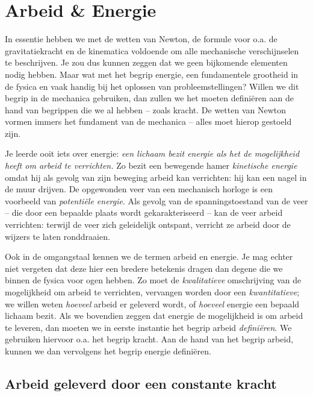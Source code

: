 
\chapter{Arbeid \& Energie}

In essentie hebben we met de wetten van Newton, de formule voor o.a. de gravitatiekracht en de kinematica voldoende om alle mechanische verschijnselen te beschrijven. Je zou dus kunnen zeggen dat we geen bijkomende elementen nodig hebben. Maar wat met het begrip energie, een fundamentele grootheid in de fysica en vaak handig bij het oplossen van probleemstellingen?  Willen we dit begrip in de mechanica gebruiken, dan zullen we het moeten defini\"eren aan de hand van begrippen die we al hebben -- zoals kracht. De wetten van Newton vormen immers het fundament van de mechanica -- alles moet hierop gestoeld zijn. 

Je leerde ooit iets over energie: \textit{een lichaam bezit energie als het de mogelijkheid heeft om arbeid te verrichten.} Zo bezit een bewegende hamer \textit{kinetische energie} omdat hij als gevolg van zijn beweging arbeid kan verrichten: hij kan een nagel in de muur drijven. De opgewonden veer
van een mechanisch horloge is een voorbeeld van \textit{potenti\"ele energie}. Als gevolg van de spanningstoestand van de veer -- die door een bepaalde plaats wordt gekarakteriseerd -- kan de veer arbeid verrichten: terwijl de veer zich geleidelijk ontspant, verricht ze arbeid door de wijzers te laten ronddraaien. %

Ook in de omgangstaal kennen we de termen arbeid en energie. Je mag echter niet vergeten dat deze hier een bredere betekenis dragen dan degene die we binnen de fysica voor ogen hebben. Zo moet de \textit{kwalitatieve} omschrijving van de mogelijkheid om arbeid te verrichten, vervangen worden door een \textit{kwantitatieve}; we willen weten \textit{hoeveel} arbeid er geleverd wordt, of \textit{hoeveel} energie een bepaald lichaam bezit. Als we bovendien zeggen dat energie de mogelijkheid is om arbeid te leveren, dan moeten we in eerste instantie het begrip arbeid \textit{defini\"eren}. We gebruiken hiervoor o.a. het begrip kracht. Aan de hand van het begrip arbeid, kunnen we dan vervolgens het begrip energie defini\"eren.

\section{Arbeid geleverd door een constante kracht}

